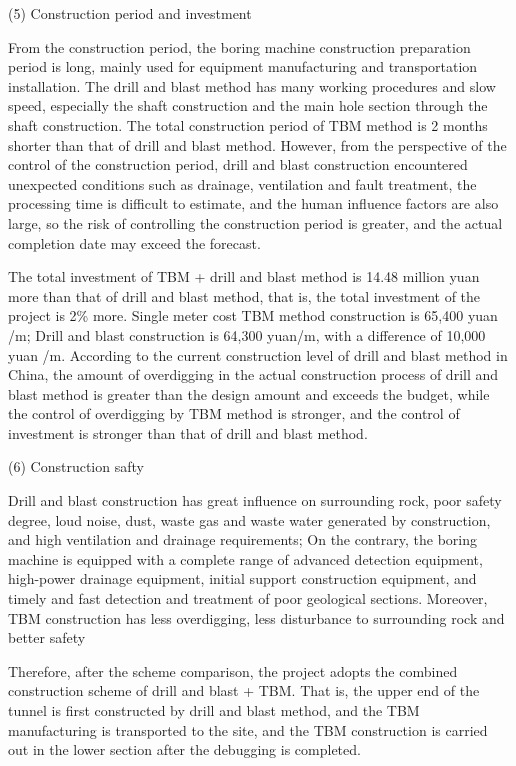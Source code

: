 \documentclass[11pt]{article}
\begin{document}
(5)	Construction period and investment

From the construction period, the boring machine construction preparation period is long, mainly used for equipment manufacturing and transportation installation. The drill and blast method has many working procedures and slow speed, especially the shaft construction and the main hole section through the shaft construction. The total construction period of TBM method is 2 months shorter than that of drill and blast method. However, from the perspective of the control of the construction period, drill and blast construction encountered unexpected conditions such as drainage, ventilation and fault treatment, the processing time is difficult to estimate, and the human influence factors are also large, so the risk of controlling the construction period is greater, and the actual completion date may exceed the forecast.

The total investment of TBM + drill and blast method is 14.48 million yuan more than that of drill and blast method, that is, the total investment of the project is 2\% more. Single meter cost TBM method construction is 65,400 yuan /m; Drill and blast construction is 64,300 yuan/m, with a difference of 10,000 yuan /m. According to the current construction level of drill and blast method in China, the amount of overdigging in the actual construction process of drill and blast method is greater than the design amount and exceeds the budget, while the control of overdigging by TBM method is stronger, and the control of investment is stronger than that of drill and blast method.

(6)	Construction safty

Drill and blast construction has great influence on surrounding rock, poor safety degree, loud noise, dust, waste gas and waste water generated by construction, and high ventilation and drainage requirements; On the contrary, the boring machine is equipped with a complete range of advanced detection equipment, high-power drainage equipment, initial support construction equipment, and timely and fast detection and treatment of poor geological sections. Moreover, TBM construction has less overdigging, less disturbance to surrounding rock and better safety

Therefore, after the scheme comparison, the project adopts the combined construction scheme of drill and blast + TBM. That is, the upper end of the tunnel is first constructed by drill and blast method, and the TBM manufacturing is transported to the site, and the TBM construction is carried out in the lower section after the debugging is completed.
\end{document}
